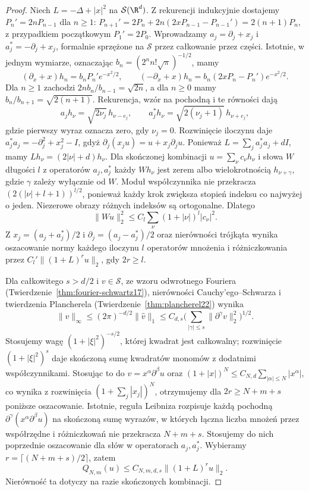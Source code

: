 \begin{proof}
Niech $L=-\Delta+|x|^2$ na $\mathcal S(\R^d)$.
Z rekurencji indukcyjnie dostajemy $P_n'=2nP_{n-1}$ dla $n\ge1$:
$P_{n+1}'=2P_n+2n(2xP_{n-1}-P_{n-1}')=2(n+1)P_n$,
z przypadkiem początkowym $P_1'=2P_0$.
Wprowadzamy $a_j=\partial_j+x_j$ i $a_j^*=-\partial_j+x_j$,
formalnie sprzężone na $\mathcal S$ przez całkowanie przez części.
Istotnie, w jednym wymiarze, oznaczając
$b_n=(2^n n!\sqrt\pi)^{-1/2}$, mamy
\[
 (\partial_x+x)h_n=b_n P_n'e^{-x^2/2},
 \qquad
 (-\partial_x+x)h_n=b_n(2xP_n-P_n')e^{-x^2/2}.
\]
Dla $n\ge1$ zachodzi $2n b_n/b_{n-1}=\sqrt{2n}$,
a dla $n\ge0$ mamy $b_n/b_{n+1}=\sqrt{2(n+1)}$.
Rekurencja, wzór na pochodną i te równości dają
\[
 a_jh_\nu=\sqrt{2\nu_j}\,h_{\nu-e_j},\qquad
 a_j^*h_\nu=\sqrt{2(\nu_j+1)}\,h_{\nu+e_j},
\]
gdzie pierwszy wyraz oznacza zero, gdy $\nu_j=0$.
Rozwinięcie iloczynu daje
$a_j^*a_j=-\partial_j^2+x_j^2-I$, gdyż
$\partial_j(x_j u)=u+x_j\partial_j u$.
Ponieważ $L=\sum_j a_j^*a_j+dI$, mamy
$Lh_\nu=(2|\nu|+d)h_\nu$.
Dla skończonej kombinacji $u=\sum_\nu c_\nu h_\nu$
i słowa $W$ długości $l$ z operatorów $a_j,a_j^*$
każdy $Wh_\nu$ jest zerem albo wielokrotnością
$h_{\nu+\gamma}$, gdzie $\gamma$ zależy wyłącznie od $W$.
Moduł współczynnika nie przekracza
$(2(|\nu|+l+1))^{l/2}$, ponieważ każdy krok zwiększa
stopień indeksu co najwyżej o jeden.
Niezerowe obrazy różnych indeksów są ortogonalne.
Dlatego
\[
 \|Wu\|_2^2\le C_l\sum_\nu(1+|\nu|)^l|c_\nu|^2.
\]
Z $x_j=(a_j+a_j^*)/2$ i $\partial_j=(a_j-a_j^*)/2$
oraz nierówności trójkąta wynika oszacowanie normy
każdego iloczynu $l$ operatorów mnożenia i różniczkowania
przez $C_l'\|(1+L)^r u\|_2$, gdy $2r\ge l$.

Dla całkowitego $s>d/2$ i $v\in\mathcal S$, ze wzoru
odwrotnego Fouriera (Twierdzenie~\ref{thm:fourier-schwartz17}),
nierówności Cauchy'ego--Schwarza i twierdzenia
Plancherela (Twierdzenie~\ref{thm:plancherel22}) wynika
\[
 \|v\|_\infty\le (2\pi)^{-d/2}\|\widehat v\|_1
 \le C_{d,s}\Big(\sum_{|\gamma|\le s}
 \|\partial^\gamma v\|_2^2\Big)^{1/2}.
\]
Stosujemy wagę $(1+|\xi|^2)^{-s/2}$, której kwadrat
jest całkowalny; rozwinięcie $(1+|\xi|^2)^s$ daje
skończoną sumę kwadratów monomów z dodatnimi współczynnikami.
Stosując to do $v=x^\alpha\partial^\beta u$ oraz
$(1+|x|)^N\le C_{N,d}\sum_{|\alpha|\le N}|x^\alpha|$,
co wynika z rozwinięcia $(1+\sum_j|x_j|)^N$,
otrzymujemy dla $2r\ge N+m+s$ poniższe oszacowanie.
Istotnie, reguła Leibniza rozpisuje każdą pochodną
$\partial^\gamma(x^\alpha\partial^\beta u)$
na skończoną sumę wyrazów, w których łączna liczba
mnożeń przez współrzędne i różniczkowań nie przekracza
$N+m+s$. Stosujemy do nich poprzednie oszacowanie
dla słów w operatorach $a_j,a_j^*$. Wybieramy
$r=\lceil(N+m+s)/2\rceil$, zatem
\[
 Q_{N,m}(u)\le C_{N,m,d,s}\|(1+L)^r u\|_2.
\]
Nierówność ta dotyczy na razie skończonych kombinacji.


\end{proof}
